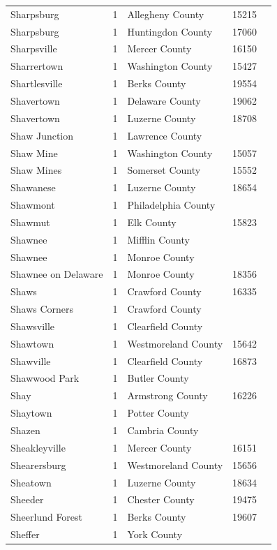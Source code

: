 \documentclass{article}
\begin{document}
\begin{tabular}{lllll}
Sharpsburg & 1 & Allegheny County & 15215 &  \\
Sharpsburg & 1 & Huntingdon County & 17060 &  \\
Sharpsville & 1 & Mercer County & 16150 &  \\
Sharrertown & 1 & Washington County & 15427 &  \\
Shartlesville & 1 & Berks County & 19554 &  \\
Shavertown & 1 & Delaware County & 19062 &  \\
Shavertown & 1 & Luzerne County & 18708 &  \\
Shaw Junction & 1 & Lawrence County &  &  \\
Shaw Mine & 1 & Washington County & 15057 &  \\
Shaw Mines & 1 & Somerset County & 15552 &  \\
Shawanese & 1 & Luzerne County & 18654 &  \\
Shawmont & 1 & Philadelphia County &  &  \\
Shawmut & 1 & Elk County & 15823 &  \\
Shawnee & 1 & Mifflin County &  &  \\
Shawnee & 1 & Monroe County &  &  \\
Shawnee on Delaware & 1 & Monroe County & 18356 &  \\
Shaws & 1 & Crawford County & 16335 &  \\
Shaws Corners & 1 & Crawford County &  &  \\
Shawsville & 1 & Clearfield County &  &  \\
Shawtown & 1 & Westmoreland County & 15642 &  \\
Shawville & 1 & Clearfield County & 16873 &  \\
Shawwood Park & 1 & Butler County &  &  \\
Shay & 1 & Armstrong County & 16226 &  \\
Shaytown & 1 & Potter County &  &  \\
Shazen & 1 & Cambria County &  &  \\
Sheakleyville & 1 & Mercer County & 16151 &  \\
Shearersburg & 1 & Westmoreland County & 15656 &  \\
Sheatown & 1 & Luzerne County & 18634 &  \\
Sheeder & 1 & Chester County & 19475 &  \\
Sheerlund Forest & 1 & Berks County & 19607 &  \\
Sheffer & 1 & York County &  &  \\

\end{tabular}
\end{document}
